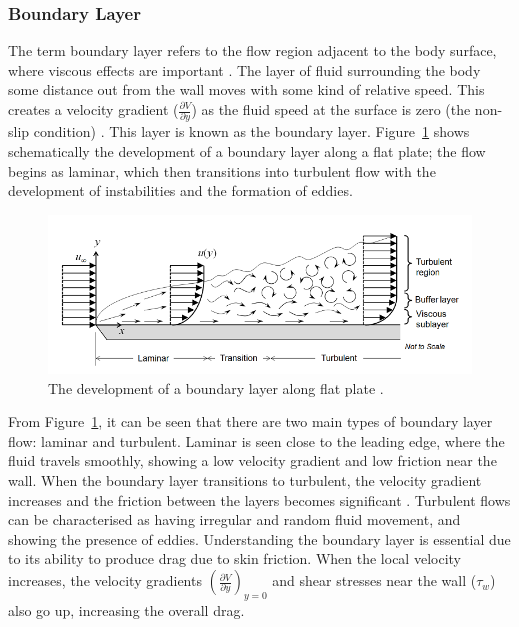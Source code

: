 \subsubsection{Boundary Layer}
The term boundary layer refers to the flow region adjacent to the body surface, where viscous effects are important \cite{Anderson2010FundamentalsAerodynamics}. The layer of fluid surrounding the body some distance out from the wall moves with some kind of relative speed. This creates a velocity gradient ($\frac{\partial V}{\partial y}$) as the fluid speed at the surface is zero (the non-slip condition)  \cite{Scibor-Rylski1984RoadAerodynamics}. This layer is known as the boundary layer. Figure~\ref{fig:3} shows schematically the development of a boundary layer along a flat plate; the flow begins as laminar, which then transitions into turbulent flow with the development of instabilities and the formation of eddies.

\begin{figure}[!htb]
    \centering
    \includegraphics[scale=0.6]{Figures/BL_laminar_turbulent.png}
    \caption{The development of a boundary layer along flat plate \cite{Frei2017WhichApplication}.}
    \label{fig:3}
\end{figure}

 
\noindent From Figure~\ref{fig:3}, it can be seen that there are two main types of boundary layer flow: laminar and turbulent. Laminar is seen close to the leading edge, where the fluid travels smoothly, showing a low velocity gradient and low friction near the wall. When the boundary layer transitions to turbulent, the velocity gradient increases and the friction between the layers becomes significant \cite{Scibor-Rylski1984RoadAerodynamics}. Turbulent flows can be characterised as having irregular and random fluid movement, and showing the presence of eddies. Understanding the boundary layer is essential due to its ability to produce drag due to skin friction. When the local velocity increases, the velocity gradients $(\frac{\partial V}{\partial y})_{y=0} $ and shear stresses near the wall ($\tau_w $) also go up, increasing the overall drag.

